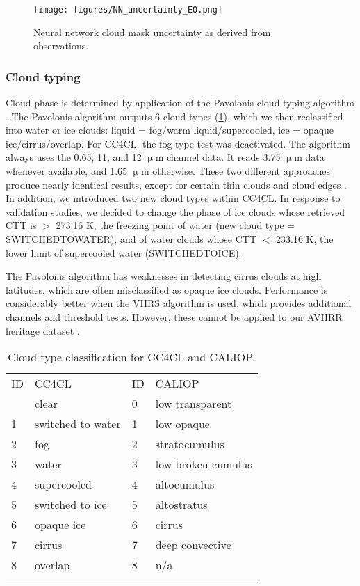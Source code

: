 \begin{figure}[h]
  \texttt{[image: figures/NN\_uncertainty\_EQ.png]}
  \caption{Neural network cloud mask uncertainty as derived from observations.}
  \label{fig:NN_unc}
\end{figure}

\subsubsection{Cloud typing}\label{sec:Pavolonis}

Cloud phase is determined by application of the Pavolonis cloud typing algorithm \citep{Pavolonis05}. The Pavolonis algorithm outputs 6 cloud types (\cref{tab:cloud_types}), which we then reclassified into water or ice clouds: liquid = fog/warm liquid/supercooled, ice = opaque ice/cirrus/overlap. For CC4CL, the fog type test was deactivated. The algorithm always uses the 0.65, 11, and 12 $\upmu$m channel data. It reads 3.75 $\upmu$m data whenever available, and 1.65 $\upmu$m otherwise. These two different approaches produce nearly identical results, except for certain thin clouds and cloud edges \citep{Pavolonis05}. In addition, we introduced two new cloud types within CC4CL. In response to validation studies, we decided to change the phase of ice clouds whose retrieved CTT is $>$ 273.16 K, the freezing point of water (new cloud type = SWITCHED\textunderscore TO\textunderscore WATER), and of water clouds whose CTT $<$ 233.16 K, the lower limit of supercooled water (SWITCHED\textunderscore TO\textunderscore ICE).

The Pavolonis algorithm has weaknesses in detecting cirrus clouds at high latitudes, which are often misclassified as opaque ice clouds. Performance is considerably better when the VIIRS algorithm is used, which provides additional channels and threshold tests. However, these cannot be applied to our AVHRR heritage dataset \citep{Pavolonis05}.

\begin{table}[h]
  \caption{Cloud type classification for CC4CL and CALIOP.}
  \begin{tabular}{l|l||l|l}
    \tophline
    ID & CC4CL & ID & CALIOP \\
    \middlehline
    0 & clear & 0 & low transparent \\
    1 & switched to water & 1 & low opaque \\
    2 & fog & 2 & stratocumulus \\
    3 & water & 3 & low broken cumulus \\
    4 & supercooled & 4 & altocumulus \\
    5 & switched to ice & 5 & altostratus \\
    6 & opaque ice & 6 & cirrus \\
    7 & cirrus & 7& deep convective \\
    8 & overlap & 8 & n/a \\
    \bottomhline
  \end{tabular}
  \label{tab:cloud_types}
\end{table}

